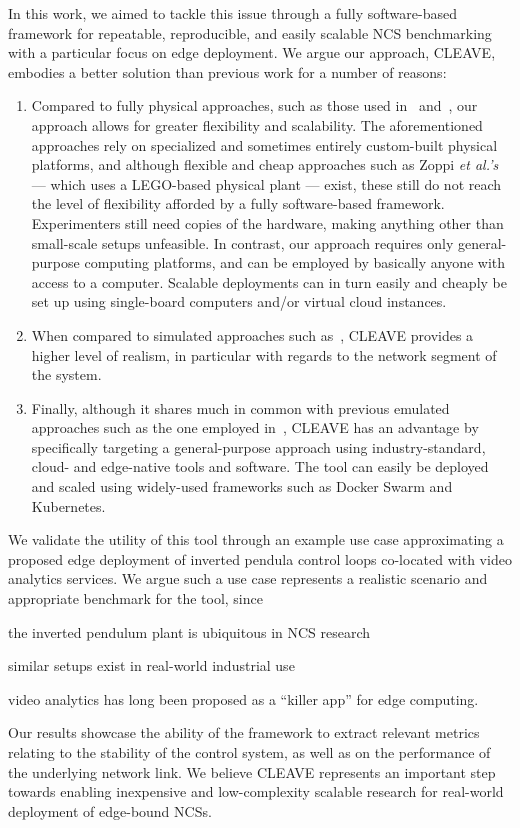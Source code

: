 In this work, we aimed to tackle this issue through a fully software-based framework for repeatable, reproducible, and easily scalable \ac{NCS} benchmarking with a particular focus on edge deployment.
We argue our approach, \ac{CLEAVE}, embodies a better solution than previous work for a number of reasons:
\begin{enumerate}
    \item Compared to fully physical approaches, such as those used in\ \cite{Baumann2018LowPower} and\ \cite{Cuenca2019UAV}, our approach allows for greater flexibility and scalability.
    The aforementioned approaches rely on specialized and sometimes entirely custom-built physical platforms, and although flexible and cheap approaches such as Zoppi \emph{et al.'s} --- which uses a LEGO-based physical plant --- exist, these still do not reach the level of flexibility afforded by a fully software-based framework. 
    Experimenters still need copies of the hardware, making anything other than small-scale setups unfeasible.
    In contrast, our approach requires only general-purpose computing platforms, and can be employed by basically anyone with access to a computer.
    Scalable deployments can in turn easily and cheaply be set up using single-board computers and/or virtual cloud instances.
    \item When compared to simulated approaches such as\ \cite{Ma2019DynamicSched}, \ac{CLEAVE} provides a higher level of realism, in particular with regards to the network segment of the system.
    \item Finally, although it shares much in common with previous emulated approaches such as the one employed in\ \cite{Wang2020VoltageControl}, \ac{CLEAVE} has an advantage by specifically targeting a general-purpose approach using industry-standard, cloud- and edge-native tools and software.
    The tool can easily be deployed and scaled using widely-used frameworks such as Docker Swarm and Kubernetes.
\end{enumerate}

We validate the utility of this tool through an example use case approximating a proposed edge deployment of inverted pendula control loops co-located with video analytics services.
We argue such a use case represents a realistic scenario and appropriate benchmark for the tool, since
\begin{enumerate*}[itemjoin={{; }}, itemjoin*={{; and }}]
    \item the inverted pendulum plant is ubiquitous in \ac{NCS} research
    \item similar setups exist in real-world industrial use
    \item video analytics has long been proposed as a ``killer app'' for edge computing.
\end{enumerate*}
Our results showcase the ability of the framework to extract relevant metrics relating to the stability of the control system, as well as on the performance of the underlying network link.
We believe \ac{CLEAVE} represents an important step towards enabling inexpensive and low-complexity scalable research for real-world deployment of edge-bound \acp{NCS}.

